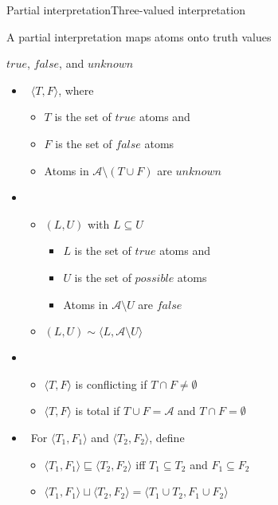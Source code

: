 \begin{frame}{Partial interpretation}{Three-valued interpretation}

  A \alert{partial interpretation} maps atoms onto truth values
  \par
  \alert{$\mathit{true}$}, \alert{$\mathit{false}$}, and \alert{$\mathit{unknown}$}
  \smallskip
  \begin{itemize}
  \item<2->  \ $\langle T,F \rangle$, where
    \begin{itemize}\normalsize
    \item $T$ is the set of $\mathit{true}$  atoms and
    \item $F$ is the set of $\mathit{false}$ atoms
    \item Atoms in $\mathcal{A} \setminus (T \cup F)$ are $\mathit{unknown}$
    \end{itemize}
    \smallskip
  \item<only@3>   \
    \begin{itemize}\normalsize
    \item $(L,U)$ with $L\subseteq U$
      \begin{itemize}\small
      \item $L$ is the set of $\mathit{true}$  atoms and
      \item $U$ is the set of $\mathit{possible}$ atoms
      \item Atoms in $\mathcal{A} \setminus U$ are $\mathit{false}$
      \end{itemize}
    \item $(L,U)\sim \langle L,\mathcal{A}\setminus U\rangle$
    \end{itemize}
  \item<only@4-> 
    \begin{itemize}\normalsize
    \item $\langle T,F \rangle$ is \alert{conflicting} if $T \cap F\neq\emptyset$
    \item $\langle T,F \rangle$ is \alert{total} if $T \cup F = \mathcal{A}$ and $T \cap F=\emptyset$
    \end{itemize}
    \smallskip
  \item<only@5->  \
    For $\langle T_1,F_1\rangle$ and $\langle T_2,F_2\rangle$, define
    \begin{itemize}\normalsize
    \item $\langle T_1,F_1\rangle \sqsubseteq \langle T_2,F_2\rangle$
      iff
      $T_1\subseteq T_2$ and $F_1\subseteq F_2$
    \item $\langle T_1,F_1\rangle \sqcup \langle T_2,F_2\rangle =
      \langle T_1 \cup T_2, F_1 \cup F_2 \rangle$
    \end{itemize}
  \end{itemize}
\end{frame}
%
